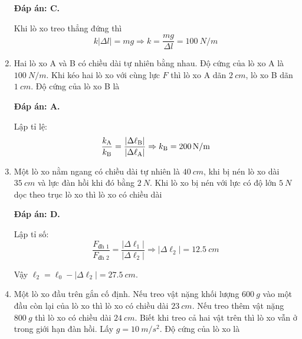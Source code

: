\begin{enumerate}[label=\bfseries Câu \arabic*:, leftmargin=1.5cm]
	\hideall
	{	
		\textbf{Đáp án: C.}
		
		Khi lò xo treo thẳng đứng thì
		$$k|\Delta l| = mg \Rightarrow k =\dfrac{mg}{\Delta l} = \SI{100}{N/m}$$
	}
	\item {}
	
	
	{
		Hai lò xo A và B có chiều dài tự nhiên bằng nhau. Độ cứng của lò xo A là $\SI{100}{N/m}$. Khi kéo hai lò xo với cùng lực $F$ thì lò xo A dãn $\SI{2}{cm}$, lò xo B dãn $\SI{1}{cm}$. Độ cứng của lò xo B là
	}
	
	\hideall
	{	
		\textbf{Đáp án: A.}
		
		Lập tỉ lệ:
		$$\dfrac{k_\text A}{k_\text B} = \dfrac{|\Delta \ell_\text B|}{|\Delta \ell_\text A|} \Rightarrow k_\text{B} = \SI{200}{N/m}$$
	}
	
	\item {}
	
	
	{
		Một lò xo nằm ngang có chiều dài tự nhiên là $\SI{40}{cm}$, khi bị nén lò xo dài $\SI{35}{cm}$ và lực đàn hồi khi đó bằng $\SI{2}{N}$. Khi lò xo bị nén với lực có độ lớn $\SI{5}{N}$ dọc theo trục lò xo thì lò xo có chiều dài
	}
	
	\hideall
	{	
		\textbf{Đáp án: D.}	
		
		Lập tỉ số:
		$$\dfrac{F_\text{đh 1}}{F_\text{đh 2}} = \dfrac{|\Delta \ell_1|}{|\Delta \ell_2|} \Rightarrow |\Delta \ell_2| = \SI{12.5}{cm}$$
		
		Vậy $\ell_2 =\ell_0-\left|\Delta\ell_2\right|= \SI{27.5}{cm}$.
	}
	\item {}
	
	
	{
		Một lò xo đầu trên gắn cố định. Nếu treo vật nặng khối lượng $\SI{600}{g}$ vào một đầu còn lại của lò xo thì lò xo có chiều dài $\SI{23}{cm}$. Nếu treo thêm vật nặng $\SI{800}{g}$ thì lò xo có chiều dài $\SI{24}{cm}$. Biết khi treo cả hai vật trên thì lò xo vẫn ở trong giới hạn đàn hồi. Lấy $g=\SI{10}{m/s^2}$. Độ cứng của lò xo là
	}
	

\end{enumerate}
